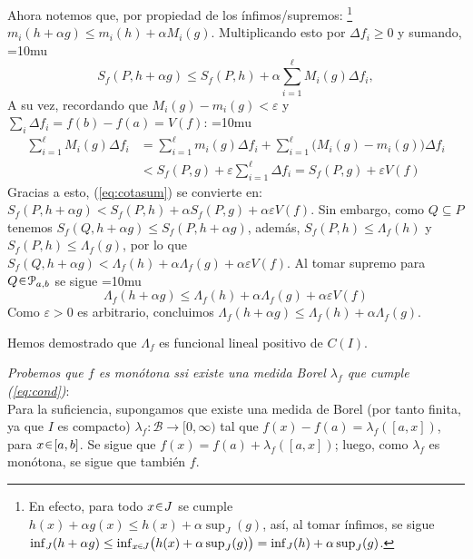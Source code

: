 \begin{sol}
\begin{enumerate}[label=(\roman*),leftmargin=1.8em]
\begin{itemize}[leftmargin=1.8em]
Ahora notemos que, por propiedad de los ínfimos/supremos:%
\footnote{
    En efecto, para todo $x\en J$ se cumple $h(x) + \alpha g(x) \leq h(x) + \alpha \sup_J(g)$, así, al tomar ínfimos, se sigue $\inf_J(h+\alpha g) \le \inf_{x\en J}\bigl(h(x) + \alpha \sup_J(g)\bigr) = \inf_J(h) + \alpha\sup_J(g)$.
} %
$m_i(h+\alpha g) \le m_i(h) + \alpha M_i(g)$.
Multiplicando esto por $\Delta f_i \ge 0$ y sumando,%
{\thickmuskip=10mu
\begin{equation}\label{eq:cotasum}
S_f(P, h+\alpha g) \le S_f(P, h) + \alpha \sum^\ell_{i=1} M_i(g)\Delta f_i,
\end{equation}
}%
A su vez, recordando que $M_i(g)-m_i(g)<\varepsilon$ y $\sum_i\Delta f_i = f(b) -f (a) = V(f)$:
{\thickmuskip=10mu
\begin{align*}
\sum^\ell_{i=1} M_i(g)\Delta f_i
&= \sum_{i=1}^\ell m_i(g)\Delta f_i +\sum_{i=1}^\ell \bigl(M_i(g)-m_i(g)\bigr)\Delta f_i\\
&< S_f(P,g) + \varepsilon\sum_{i=1}^\ell \Delta f_i = S_f(P,g) + \varepsilon V(f)
\end{align*}
}%
Gracias a esto, (\ref{eq:cotasum}) se convierte en: $S_f(P, h+\alpha g) < S_f(P, h) + \alpha S_f(P,g) + \alpha\varepsilon V(f)$. Sin embargo, como $Q \subseteq P$ tenemos $S_f(Q, h+\alpha g) \le S_f(P, h+\alpha g)$, además, $S_f(P, h) \le \Lambda_f(h)$ y $S_f(P, h)\le \Lambda_f(g)$, por lo que $S_f(Q, h+\alpha g) < \Lambda_f(h) + \alpha\Lambda_f(g) + \alpha\varepsilon V(f)$. Al tomar supremo para $Q\en\mathcal{P}_{a,b}$ se sigue
{\thickmuskip=10mu
\[
\Lambda_f(h+\alpha g) \le \Lambda_f(h) + \alpha\Lambda_f(g) + \alpha\varepsilon V(f)
\]
}%
Como $\varepsilon> 0$ es arbitrario, concluimos $\Lambda_f(h+\alpha g)\le \Lambda_f(h)+\alpha\Lambda_f(g)$.
\end{itemize}
Hemos demostrado que $\Lambda_f$ es funcional lineal positivo de $C(I)$.\par
\medskip
\emph{Probemos que $f$ es monótona ssi existe una medida Borel $\lambda_f$ que cumple (\ref{eq:cond})}:\\
Para la suficiencia, supongamos que existe una medida de Borel (por tanto finita, ya que $I$ es compacto) $\lambda_f \colon \mathcal{B} \to [0,\infty)$ tal que $f(x) - f(a) = \lambda_f([a,x])$, para $x\en[a,b]$. Se sigue que $f(x) = f(a) + \lambda_f([a,x])$; luego, como $\lambda_f$ es monótona, se sigue que también $f$.\par

\end{enumerate}
\end{sol}
